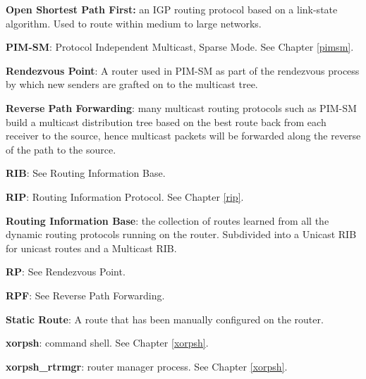 \begin{description}
\item{\bf Open Shortest Path First:} an IGP routing protocol based on
a link-state algorithm.  Used to route within medium to large networks.
\item{\bf PIM-SM}: Protocol Independent Multicast, Sparse Mode. See
  Chapter \ref{pimsm}.
\item{\bf Rendezvous Point}: A router used in PIM-SM as part of the
rendezvous process by which new senders are grafted on to the
multicast tree.
\item{\bf Reverse Path Forwarding}: many multicast routing protocols
  such as PIM-SM build a multicast distribution tree based on the best
  route back from each receiver to the source, hence multicast packets
  will be forwarded along the reverse of the path to the source.
\item{\bf RIB}: See Routing Information Base.
\item{\bf RIP}: Routing Information Protocol.  See Chapter \ref{rip}.
\item{\bf Routing Information Base}: the collection of routes learned
  from all the dynamic routing protocols running on the router.
  Subdivided into a Unicast RIB for unicast routes and a Multicast
  RIB.
\item{\bf RP}: See Rendezvous Point.
\item{\bf RPF}: See Reverse Path Forwarding.
\item{\bf Static Route}: A route that has been manually configured on
the router.  
\item{\bf xorpsh}: \xorp command shell.  See Chapter \ref{xorpsh}.
\item{\bf xorpsh\_rtrmgr}: \xorp router manager process.  See Chapter
\ref{xorpsh}.
\end{description}